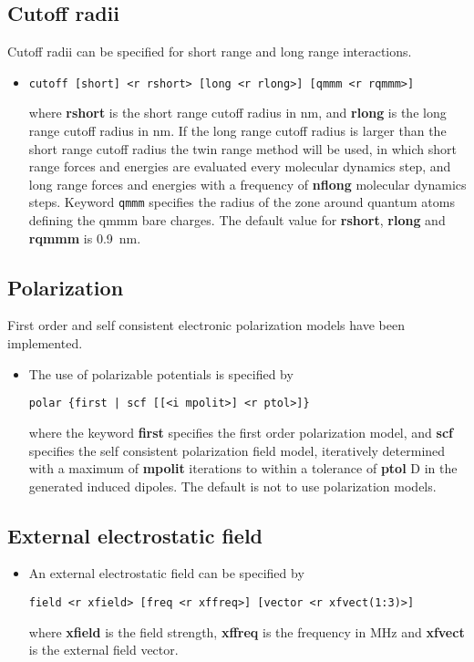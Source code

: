 \subsection{Cutoff radii}
Cutoff radii can be specified for short range and long range interactions.
\begin{itemize}
\item
\begin{verbatim}
cutoff [short] <r rshort> [long <r rlong>] [qmmm <r rqmmm>]
\end{verbatim}
where {\bf rshort} is the short range cutoff radius in nm, and {\bf rlong}
is the long range cutoff radius in nm. If the long range cutoff radius
is larger than the short range cutoff radius the twin range method will
be used, in which short range forces and energies are evaluated every
molecular dynamics step, and long range forces and energies with a
frequency of {\bf nflong} molecular dynamics steps. Keyword
\verb+qmmm+ specifies the radius of the zone around quantum atoms
defining the qmmm bare charges.
The default value for {\bf rshort}, {\bf rlong} and {\bf rqmmm} is 0.9~nm.
\end{itemize}
\subsection{Polarization}
First order and self consistent electronic polarization models have
been implemented.
\begin{itemize}
\item
The use of polarizable potentials is specified by
\begin{verbatim}
polar {first | scf [[<i mpolit>] <r ptol>]}
\end{verbatim}
where the keyword {\bf first} specifies the first order polarization
model, and {\bf scf} specifies the self consistent polarization field
model, iteratively determined with a maximum of {\bf mpolit}
iterations to within a tolerance of {\bf ptol} D in the generated
induced dipoles. The default is not to use polarization models.
\end{itemize}
\subsection{External electrostatic field}
\begin{itemize}
\item
An external electrostatic field can be specified by
\begin{verbatim}
field <r xfield> [freq <r xffreq>] [vector <r xfvect(1:3)>]
\end{verbatim}
where {\bf xfield} is the field strength, {\bf xffreq} is the
frequency in MHz and {\bf xfvect} is the external field vector.
\end{itemize}
